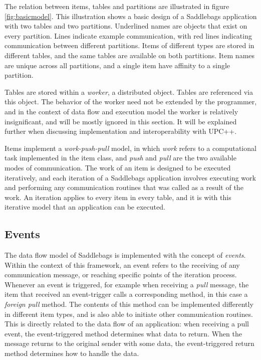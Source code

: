 \documentclass{uit-report}
\begin{document}
The relation between items, tables and partitions are illustrated in figure \ref{fig:basicmodel}. This illustration shows a basic design of a Saddlebags application with two tables and two partitions. Underlined names are objects that exist on every partition. Lines indicate example communication, with red lines indicating communication between different partitions. Items of different types are stored in different tables, and the same tables are available on both partitions. Item names are unique across all partitions, and a single item have affinity to a single partition. 

Tables are stored within a \emph{worker}, a distributed object. Tables are referenced via this object. The behavior of the worker need not be extended by the programmer, and in the context of data flow and execution model the worker is relatively insignificant, and will be mostly ignored in this section. It will be explained further when discussing implementation and interoperability with UPC++.

Items implement a \emph{work-push-pull} model, in which \emph{work} refers to a computational task implemented in the item class, and \emph{push} and \emph{pull} are the two available modes of communication. The work of an item is designed to be executed iteratively, and each iteration of a Saddlebags application involves executing work and performing any communication routines that was called as a result of the work. An iteration applies to every item in every table, and it is with this iterative model that an application can be executed. 

\subsection{Events} \label{section:events}
The data flow model of Saddlebags is implemented with the concept of \emph{events}. Within the context of this framework, an event refers to the receiving of any communication message, or reaching specific points of the iteration process. Whenever an event is triggered, for example when receiving a \emph{pull} message, the item that received an event-trigger calls a corresponding method, in this case a \emph{foreign pull} method. The contents of this method can be implemented differently in different item types, and is also able to initiate other communication routines. This is directly related to the data flow of an application: when receiving a pull event, the event-triggered method determines what data to return. When the message returns to the original sender with some data, the event-triggered return method determines how to handle the data. 
\newpage
\end{document}
